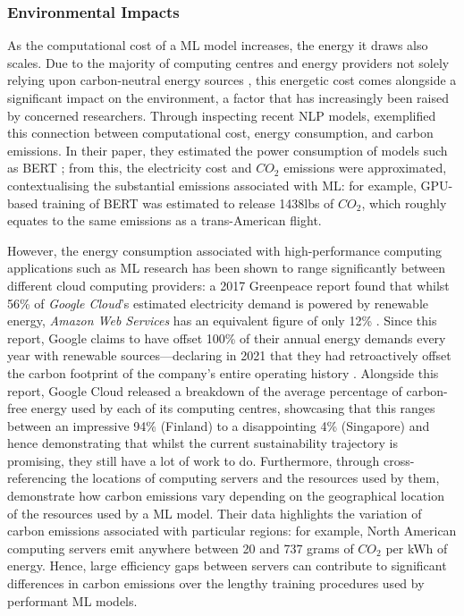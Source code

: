 \documentclass[a4paper, 12pt]{article}
\begin{document}
    \subsubsection{Environmental Impacts}

    As the computational cost of a ML model increases, the energy it draws also scales. Due to the majority of computing centres and energy providers not solely relying upon carbon-neutral energy sources \cite{strubell-2019}, this energetic cost comes alongside a significant impact on the environment, a factor that has increasingly been raised by concerned researchers. Through inspecting recent NLP models,  exemplified this connection between computational cost, energy consumption, and carbon emissions. In their paper, they estimated the power consumption of models such as BERT \cite{devlin-2019}; from this, the electricity cost and $CO_2$ emissions were approximated, contextualising the substantial emissions associated with ML: for example, GPU-based training of BERT was estimated to release 1438lbs of $CO_2$, which roughly equates to the same emissions as a trans-American flight.

    However, the energy consumption associated with high-performance computing applications such as ML research has been shown to range significantly between different cloud computing providers: a 2017 Greenpeace report found that whilst 56\% of \emph{Google Cloud}'s estimated electricity demand is powered by renewable energy, \emph{Amazon Web Services} has an equivalent figure of only 12\% \cite{cook-2017}. Since this report, Google claims to have offset 100\% of their annual energy demands every year with renewable sources---declaring in 2021 that they had retroactively offset the carbon footprint of the company's entire operating history \cite{google-2021}. Alongside this report, Google Cloud released a breakdown of the average percentage of carbon-free energy used by each of its computing centres, showcasing that this ranges between an impressive 94\% (Finland) to a disappointing 4\% (Singapore) and hence demonstrating that whilst the current sustainability trajectory is promising, they still have a lot of work to do. Furthermore, through cross-referencing the locations of computing servers and the resources used by them,  demonstrate how carbon emissions vary depending on the geographical location of the resources used by a ML model. Their data highlights the variation of carbon emissions associated with particular regions: for example, North American computing servers emit anywhere between 20 and 737 grams of $CO_2$ per kWh of energy. Hence, large efficiency gaps between servers can contribute to significant differences in carbon emissions over the lengthy training procedures used by performant ML models.
\end{document}
